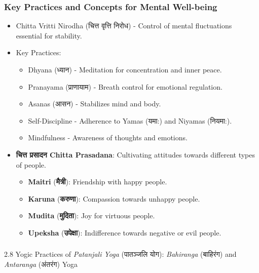 \begin{frame}[fragile]\frametitle{Key Practices and Concepts for Mental Well-being}

      \begin{itemize}
		\item Chitta Vritti Nirodha (चित्त वृत्ति निरोध) - Control of mental fluctuations essential for stability.
		\item Key Practices: 
		\begin{itemize}
			\item Dhyana (ध्यान) - Meditation for concentration and inner peace.
			\item Pranayama (प्राणायाम) - Breath control for emotional regulation.
			\item Asanas (आसन) - Stabilizes mind and body.
			\item Self-Discipline - Adherence to Yamas (यमा:) and Niyamas (नियमा:).
			\item Mindfulness - Awareness of thoughts and emotions.
		\end{itemize}
        \item \textbf{चित्त प्रसादन  Chitta Prasadana}: Cultivating attitudes towards different types of people.
        \begin{itemize}
            \item \textbf{Maitri} (\textbf{मैत्री}): Friendship with happy people.
            \item \textbf{Karuna} (\textbf{करुणा}): Compassion towards unhappy people.
            \item \textbf{Mudita} (\textbf{मुदिता}): Joy for virtuous people.
            \item \textbf{Upeksha} (\textbf{उपेक्षा}): Indifference towards negative or evil people.
        \end{itemize}
      \end{itemize}

\end{frame}


\begin{frame}[fragile]\frametitle{}
\begin{center}
{\Large 2.8  Yogic Practices of \textit{Patanjali Yoga} (पातञ्जलि योग): \textit{Bahiranga} (बाहिरंग) and \textit{Antaranga} (अंतरंग) Yoga}
\end{center}
\end{frame}

